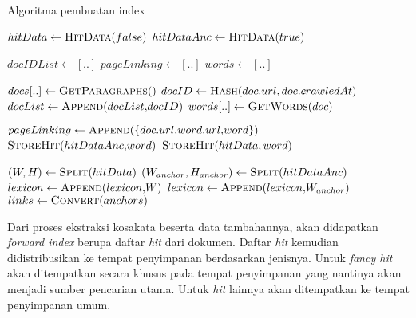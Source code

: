 \begin{algorithm}[H]
  \caption{Algoritma pembuatan index}\label{alg:index}
  \begin{algorithmic}
    \State $hitData \gets \Call{HitData}{false}$ 
    \State $hitDataAnc \gets \Call{HitData}{true}$

    \item[] %

    \State $docIDList \gets [..]$
    \State $pageLinking \gets [..]$
    \State $words \gets [..]$

    \item[] %

    \State $docs[..] \gets \Call{GetParagraphs}{$$}$ 
      \State $docID \gets \Call{Hash}{$$doc.url, doc.crawledAt$$}$
      \State $docList \gets \Call{Append}{$$docList$$, $$docID$$}$
      \State $words[..] \gets \Call{GetWords}{$$doc$$}$ 

      \item[] %

          \State $pageLinking \gets \Call{Append}{\{$$doc.url$$, $$word.url$$, $$word$$\}}$
          \State $\Call{StoreHit}{$$hitDataAnc$$, $$word$$}$
        \Else
          \State $\Call{StoreHit}{$$hitData, word$$}$
        \EndIf
      \EndFor
    \EndFor

    \item[] %

    \State $(W, H) \gets \Call{Split}{$$hitData$$}$
    \State $(W_{anchor}, H_{anchor}) \gets \Call{Split}{$$hitDataAnc$$}$
    \State $lexicon \gets \Call{Append}{$$lexicon$$, $$W$$}$
    \State $lexicon \gets \Call{Append}{$$lexicon$$, $$W_{anchor}$$}$
    \State $links \gets \Call{Convert}{$$anchors$$}$ 
  \end{algorithmic}
\end{algorithm}

Dari proses ekstraksi kosakata beserta data tambahannya, akan didapatkan
\textit{forward index} berupa daftar \textit{hit} dari dokumen.  Daftar
\textit{hit} kemudian didistribusikan ke tempat penyimpanan berdasarkan
jenisnya. Untuk \textit{fancy hit} akan ditempatkan secara khusus pada tempat
penyimpanan yang nantinya akan menjadi sumber pencarian utama. Untuk
\textit{hit} lainnya akan ditempatkan ke tempat penyimpanan umum.

